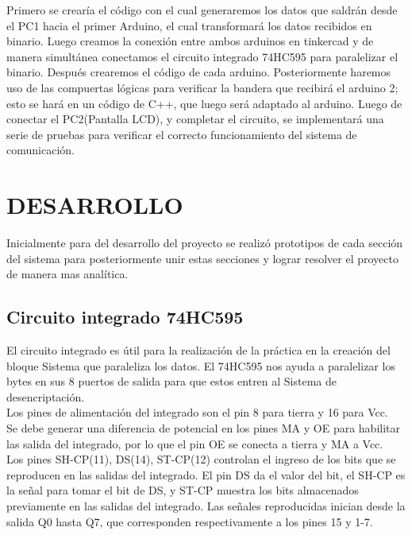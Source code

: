 \documentclass{article}
\begin{document}
	Primero se crearía el código con el cual generaremos los datos que saldrán desde el PC1 hacia el primer Arduino, el cual transformará los datos recibidos en binario. 
Luego creamos la conexión entre ambos arduinos en tinkercad y de manera simultánea conectamos el circuito integrado 74HC595 para paralelizar el binario.
Después crearemos el código de cada arduino. 
Posteriormente haremos uso de las compuertas lógicas para verificar la bandera que recibirá el arduino 2; esto se hará en un código de C++, que luego será adaptado al arduino.
Luego de conectar el PC2(Pantalla LCD), y completar el circuito, se implementará una serie de pruebas para verificar el correcto funcionamiento del sistema de comunicación. 


\section{DESARROLLO}

Inicialmente para del desarrollo del proyecto se realizó prototipos de cada sección del sistema para posteriormente unir estas secciones y lograr resolver el proyecto de manera mas analítica.

\subsection{Circuito integrado 74HC595}
El circuito integrado es útil para la realización de la práctica en la creación del bloque Sistema que paraleliza los datos. El 74HC595 nos ayuda a paralelizar los bytes en sus 8 puertos de salida para que estos entren al Sistema de desencriptación.\\

Los pines de alimentación del integrado son el pin 8 para tierra y 16 para Vcc.\\

Se debe generar una diferencia de potencial en los pines MA y OE para habilitar las salida del integrado, por lo que el pin OE se conecta a tierra y MA a Vcc.\\

Los pines SH-CP(11), DS(14), ST-CP(12) controlan el ingreso de los bits que se reproducen en las salidas del integrado. El pin DS da el valor del bit, el SH-CP es la señal para tomar el bit de DS, y ST-CP muestra los bits almacenados previamente en las salidas del integrado. Las señales reproducidas inician desde la salida Q0 hasta Q7, que corresponden respectivamente a los pines 15 y 1-7. \cite{youtube}\\
\end{document}
